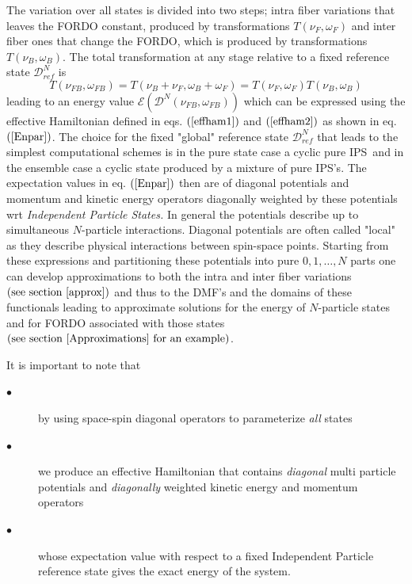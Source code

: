 \documentclass[aps,preprint]{revtex4}%
\begin{document}
The variation over all states is divided into two steps; intra fiber
variations that leaves the FORDO constant, produced by transformations
$T\left(  \nu_{F},\omega_{F}\right)  $ and inter fiber ones that change the
FORDO, which is produced by transformations $T\left(  \nu_{B},\omega
_{B}\right)  $. The total transformation at any stage relative to a fixed
reference state $\mathcal{D}_{ref}^{N}$ is
\begin{equation}
T\left(  \nu_{FB},\omega_{FB}\right)  =T\left(  \nu_{B}+\nu_{F},\omega
_{B}+\omega_{F}\right)  =T\left(  \nu_{F},\omega_{F}\right)  T\left(  \nu
_{B},\omega_{B}\right)
\end{equation}
leading to an energy value $\mathcal{E}\left(  \mathcal{D}^{N}\left(  \nu
_{FB},\omega_{FB}\right)  \right)  $ which can be expressed using the
effective Hamiltonian defined in eqs. $\left(  \ref{effham1}\right)  $ and
$\left(  \ref{effham2}\right)  $ as shown in eq. $\left(  \ref{Enpar}\right)
$. The choice for the fixed "global" reference state $\mathcal{D}_{ref}^{N}$
that leads to the simplest computational schemes is in the pure state case a
cyclic pure IPS\ and in the ensemble case a cyclic state produced by a mixture
of pure IPS's. The expectation values in eq. $\left(  \ref{Enpar}\right)  $
then are of diagonal potentials and momentum and kinetic energy operators
diagonally weighted by these potentials wrt \emph{Independent Particle
States.} In general the potentials describe up to simultaneous $N$-particle
interactions. Diagonal potentials are often called "local" \cite{locpot} as
they describe physical interactions between spin-space points. Starting from
these expressions and partitioning these potentials into pure $0,1,\ldots,N$
parts one can develop approximations to both the intra and inter fiber
variations $\left(  \text{see section \ref{approx}}\right)  $ and thus to the
DMF's and the domains of these functionals leading to approximate solutions
for the energy of $N$-particle states and for FORDO associated with those
states $\left(  \text{see section \ref{Approximations} for an example}\right)
$.

It is important to note that

\begin{description}
\item[$\bullet$] by using space-spin diagonal operators to parameterize
\emph{all }states

\item[$\bullet$] we produce an effective Hamiltonian that contains
\emph{diagonal} multi particle potentials and \emph{diagonally} weighted
kinetic energy and momentum operators

\item[$\bullet$] whose expectation value with respect to a fixed Independent
Particle reference state gives the exact energy of the system.
\end{description}
\end{document}
